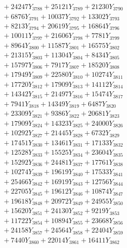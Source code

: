 \documentclass[a4paper,10pt]{article}
\begin{document}
{\begin{align}
&\;  + 24247 Y_{3788} + 25121 Y_{3789} + 21230 Y_{3790} \\[0.3ex]
&\;  + 6876 Y_{3791} + 10037 Y_{3792} + 13302 Y_{3793} \\[0.3ex]
&\;  + 8213 Y_{3794} + 20619 Y_{3795} + 16864 Y_{3796} \\[0.3ex]
&\;  + 10011 Y_{3797} + 21606 Y_{3798} + 7781 Y_{3799} \\[0.3ex]
&\;  + 8964 Y_{3800} + 11587 Y_{3801} + 16575 Y_{3802} \\[0.3ex]
&\;  + 21315 Y_{3803} + 11304 Y_{3804} + 8434 Y_{3805} \\[0.3ex]
&\;  + 15797 Y_{3806} + 7917 Y_{3807} + 18520 Y_{3808} \\[0.5ex]\allowbreak
&\;  + 17949 Y_{3809} + 22580 Y_{3810} + 10274 Y_{3811} \\[0.3ex]
&\;  + 17720 Y_{3812} + 17909 Y_{3813} + 14112 Y_{3814} \\[0.3ex]
&\;  + 14342 Y_{3815} + 21497 Y_{3816} + 15474 Y_{3817} \\[0.3ex]
&\;  + 7941 Y_{3818} + 14349 Y_{3819} + 6487 Y_{3820} \\[0.3ex]
&\;  + 23309 Y_{3821} + 9386 Y_{3822} + 20681 Y_{3823} \\[0.3ex]
&\;  + 17909 Y_{3824} + 14323 Y_{3825} + 24000 Y_{3826} \\[0.3ex]
&\;  + 10292 Y_{3827} + 21445 Y_{3828} + 6732 Y_{3829} \\[0.3ex]
&\;  + 17451 Y_{3830} + 13461 Y_{3831} + 17133 Y_{3832} \\[0.3ex]
&\;  + 12528 Y_{3833} + 15525 Y_{3834} + 23604 Y_{3835} \\[0.3ex]
&\;  + 15292 Y_{3836} + 24481 Y_{3837} + 17761 Y_{3838} \\[0.5ex]\allowbreak
&\;  + 10274 Y_{3839} + 19619 Y_{3840} + 17533 Y_{3841} \\[0.3ex]
&\;  + 25466 Y_{3842} + 16919 Y_{3843} + 12756 Y_{3844} \\[0.3ex]
&\;  + 22705 Y_{3845} + 19612 Y_{3846} + 10874 Y_{3847} \\[0.3ex]
&\;  + 19618 Y_{3848} + 20972 Y_{3849} + 24955 Y_{3850} \\[0.3ex]
&\;  + 15620 Y_{3851} + 24130 Y_{3852} + 9219 Y_{3853} \\[0.3ex]
&\;  + 11722 Y_{3854} + 10894 Y_{3855} + 23668 Y_{3856} \\[0.3ex]
&\;  + 24158 Y_{3857} + 24564 Y_{3858} + 22404 Y_{3859} \\[0.3ex]
&\;  + 7440 Y_{3860} + 22014 Y_{3861} + 16411 Y_{3862} \\[0.3ex]

\end{align}}
\end{document}
